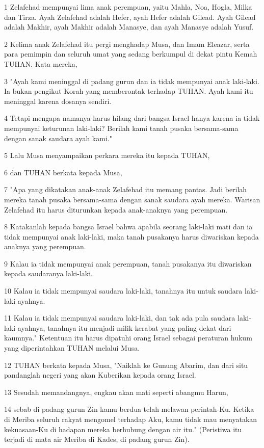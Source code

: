 \par 1 Zelafehad mempunyai lima anak perempuan, yaitu Mahla, Noa, Hogla, Milka dan Tirza. Ayah Zelafehad adalah Hefer, ayah Hefer adalah Gilead. Ayah Gilead adalah Makhir, ayah Makhir adalah Manasye, dan ayah Manasye adalah Yusuf.
\par 2 Kelima anak Zelafehad itu pergi menghadap Musa, dan Imam Eleazar, serta para pemimpin dan seluruh umat yang sedang berkumpul di dekat pintu Kemah TUHAN. Kata mereka,
\par 3 "Ayah kami meninggal di padang gurun dan ia tidak mempunyai anak laki-laki. Ia bukan pengikut Korah yang memberontak terhadap TUHAN. Ayah kami itu meninggal karena dosanya sendiri.
\par 4 Tetapi mengapa namanya harus hilang dari bangsa Israel hanya karena ia tidak mempunyai keturunan laki-laki? Berilah kami tanah pusaka bersama-sama dengan sanak saudara ayah kami."
\par 5 Lalu Musa menyampaikan perkara mereka itu kepada TUHAN,
\par 6 dan TUHAN berkata kepada Musa,
\par 7 "Apa yang dikatakan anak-anak Zelafehad itu memang pantas. Jadi berilah mereka tanah pusaka bersama-sama dengan sanak saudara ayah mereka. Warisan Zelafehad itu harus diturunkan kepada anak-anaknya yang perempuan.
\par 8 Katakanlah kepada bangsa Israel bahwa apabila seorang laki-laki mati dan ia tidak mempunyai anak laki-laki, maka tanah pusakanya harus diwariskan kepada anaknya yang perempuan.
\par 9 Kalau ia tidak mempunyai anak perempuan, tanah pusakanya itu diwariskan kepada saudaranya laki-laki.
\par 10 Kalau ia tidak mempunyai saudara laki-laki, tanahnya itu untuk saudara laki-laki ayahnya.
\par 11 Kalau ia tidak mempunyai saudara laki-laki, dan tak ada pula saudara laki-laki ayahnya, tanahnya itu menjadi milik kerabat yang paling dekat dari kaumnya." Ketentuan itu harus dipatuhi orang Israel sebagai peraturan hukum yang diperintahkan TUHAN melalui Musa.
\par 12 TUHAN berkata kepada Musa, "Naiklah ke Gunung Abarim, dan dari situ pandanglah negeri yang akan Kuberikan kepada orang Israel.
\par 13 Sesudah memandangnya, engkau akan mati seperti abangmu Harun,
\par 14 sebab di padang gurun Zin kamu berdua telah melawan perintah-Ku. Ketika di Meriba seluruh rakyat mengomel terhadap Aku, kamu tidak mau menyatakan kekuasaan-Ku di hadapan mereka berhubung dengan air itu." (Peristiwa itu terjadi di mata air Meriba di Kades, di padang gurun Zin).
